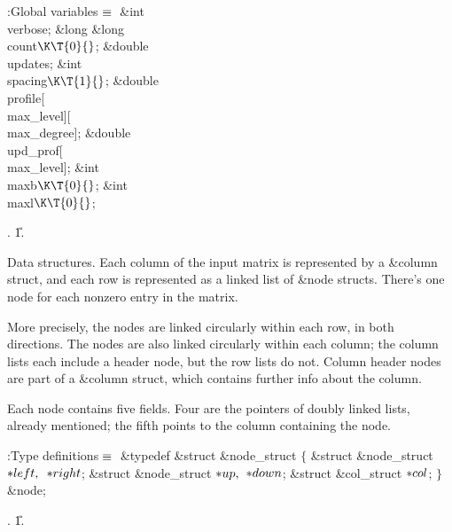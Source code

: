 \B{}:Global variables\X${}\equiv{}$\6
\&{int} \\{verbose};%
\6
\&{long} \&{long} \\{count}${}\K\T{0}{}$;%
\6
\&{double} \\{updates};\6
\&{int} \\{spacing}${}\K\T{1}{}$;\6
\&{double} \\{profile}[\\{max\_level}][\\{max\_degree}];\6
\&{double} \\{upd\_prof}[\\{max\_level}];\6
\&{int} \\{maxb}${}\K\T{0}{}$;\6
\&{int} \\{maxl}${}\K\T{0}{}$;\par
{}.
\U1.\fi

Data structures.
Each column of the input matrix is represented by a \&{column} struct,
and each row is represented as a linked list of \&{node} structs. There's one
node for each nonzero entry in the matrix.

More precisely, the nodes are linked circularly within each row, in
both directions. The nodes are also linked circularly within each column;
the column lists each include a header node, but the row lists do not.
Column header nodes are part of a \&{column} struct, which
contains further info about the column.

Each node contains five fields. Four are the pointers of doubly linked lists,
already mentioned; the fifth points to the column containing the node.

\Y\B\4:Type definitions\X${}\equiv{}$\6
\&{typedef} \&{struct} \&{node\_struct} ${}\{{}$\1\6
\&{struct} \&{node\_struct} ${}{*}\\{left},{}$ ${}{*}\\{right}{}$;\6
\&{struct} \&{node\_struct} ${}{*}\\{up},{}$ ${}{*}\\{down}{}$;\6
\&{struct} \&{col\_struct} ${}{*}\\{col}{}$;\2\6
${}\}{}$ \&{node};\par
{}.
\U1.\fi

